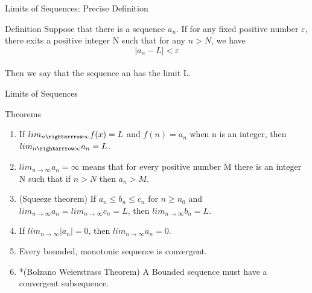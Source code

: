\documentclass{beamer}
\begin{document}
\begin{frame}{Limits of Sequences: Precise Definition}
\begin{block}{Definition}
    Suppose that there is a sequence $a_n$. If for any fixed positive number $\varepsilon$, there exits a positive integer N such that for any $n > N$, we have\\
    $$|a_n - L|< \varepsilon$$\\
    Then we say that the sequence an has the limit L.
\end{block}
    
\end{frame}
\begin{frame}{Limits of Sequences}
    \begin{block}{Theorems}
        \begin{enumerate}
            \item  If $lim_{n\rightarrrow \infty} f (x) = L$ and $f (n) = a_n$ when n is an integer, then $lim_{n\rightarrrow \infty} a_n = L$.
            \item $lim_{n\rightarrow \infty} a_n = \infty$ means that for every positive number M there is an integer N such that if $n > N$ then $a_n > M$.
            \item  (Squeeze theorem) If $a_n \leqslant b_n \leqslant c_n$ for $n \geqslant n_0$ and $lim_{n \rightarrow \infty} a_n = lim_{n \rightarrow \infty} c_n = L$, then $lim_{n\rightarrow\infty} b_n = L$.
            \item If $lim_{n \rightarrow \infty} |a_n| = 0$, then $lim_{n \rightarrow \infty} a_n = 0$.
            \item Every bounded, monotonic sequence is convergent.
            \item *(Bolzano Weierstrass Theorem) A Bounded sequence must have a convergent subsequence.
        \end{enumerate}
    \end{block}
\end{frame}
\end{document}
